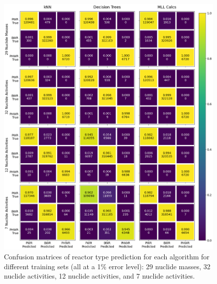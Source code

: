 \begin{figure}[!htb]
  \centering
  \includegraphics[width=\textwidth]{./chapters/exp2/confusion_matrix_nucs_acts.png}
  \caption{Confusion matrices of reactor type prediction for each algorithm 
           for different training sets (all at a 1\% error level): 29 nuclide 
           masses, 32 nuclide activities, 12 nuclide activities, and 7 nuclide 
           activities.}
  \label{fig:cm_nucs_acts}
\end{figure}

